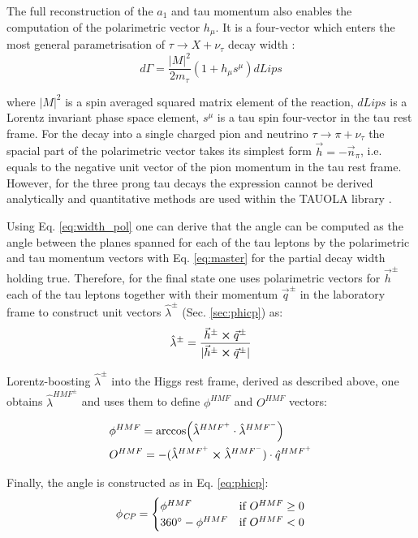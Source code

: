 The full reconstruction of the $a_1$ and tau momentum also enables the computation of the polarimetric vector $h_\mu$. It is a four-vector which enters the most general parametrisation of $\tau \to X + \nu_\tau$ decay width \cite{Davier:1992nw,Kuhn:1992nz}:
\begin{equation}\label{eq:width_pol}
    d\Gamma = \dfrac{|M|^2}{2m_\tau}(1+h_\mu s^\mu)dLips
\end{equation}

where $|M|^2$ is a spin averaged squared matrix element of the reaction, $dLips$ is a Lorentz invariant phase space element, $s^\mu$ is a tau spin four-vector in the tau rest frame. For the decay into a single charged pion and neutrino $\tau \to \pi + \nu_\tau$ the spacial part of the polarimetric vector takes its simplest form $\vec{h} = -\vec{n}_\pi$, i.e. equals to the negative unit vector of the pion momentum in the tau rest frame. However, for the three prong tau decays the expression cannot be derived analytically and quantitative methods are used within the TAUOLA library \cite{Jadach:1990mz,Jezabek:1991qp,Jadach:1993hs}.

Using Eq. \ref{eq:width_pol} one can derive that the \phicp angle can be computed as the angle between the planes spanned for each of the tau leptons by the polarimetric and tau momentum vectors with Eq. \ref{eq:master} for the partial decay width holding true. Therefore, for the \aaa final state one uses polarimetric vectors for $\vec{h}^\pm$ each of the tau leptons together with their momentum $\vec{q}^\pm$ in the laboratory frame to construct unit vectors $\hat{\lambda}^{\pm}$ (Sec. \ref{sec:phicp}) as:
\begin{equation}
    \hat{\lambda}^\pm = \dfrac{\vec{h}^\pm \cross \vec{q}^\pm}{|\vec{h}^\pm \cross \vec{q}^\pm|}
\end{equation}

Lorentz-boosting $\hat{\lambda}^{\pm}$ into the Higgs rest frame, derived as described above, one obtains $\hat{\lambda}^{HMF^\pm}$ and uses them to define $\phi^{HMF}$ and $O^{HMF}$ vectors:

\begin{align}
    &\phi^{HMF} = \arccos(\hat{\lambda}^{HMF^+} \cdot \hat{\lambda}^{HMF^-})\\
    &O^{HMF} = - (\hat{\lambda}^{HMF^+} \cross \hat{\lambda}^{HMF^-}) \cdot \hat{q}^{HMF^+}
\end{align}

Finally, the \phicp angle is constructed as in Eq. \ref{eq:phicp}:
\begin{equation}
    \phi_{\textit{CP}} = 
    \begin{cases}
    \phi^{HMF} & \text{if} ~O^{HMF} \geq 0 \\
    360^\circ - \phi^{HMF} & \text{if} ~O^{HMF} < 0
    \end{cases}
\end{equation}

